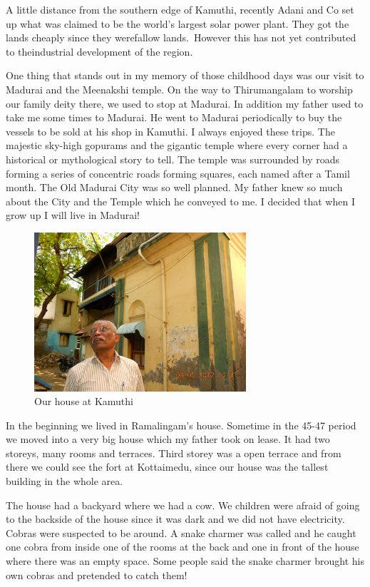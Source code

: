 A little distance from the southern edge of Kamuthi, recently Adani and 
Co set up what was claimed to be the world's largest solar power plant. 
They got the lands cheaply since they were\break fallow lands.\ However this 
has not yet contributed to the\break industrial development of the region.

One thing that stands out in my memory of those childhood days was our 
visit to Madurai and the Meenakshi temple. On the way to Thirumangalam 
to worship our family deity there, we used to stop at Madurai. In 
addition my father used to take me some times to Madurai. He went to 
Madurai periodically to buy the vessels to be sold at his shop in 
Kamuthi. I always enjoyed these trips. The majestic sky-high gopurams 
and the gigantic temple where every corner had a historical or 
mythological story to tell. The temple was surrounded by roads forming a 
series of concentric roads forming squares, each named after a Tamil 
month. The Old Madurai City was so well planned. My father knew so much 
about the City and the Temple which he conveyed to me. I decided that 
when I grow up I will live in Madurai!
\smallskip

\begin{figure}[h]
\centering
\includegraphics[width=0.7\textwidth]{images/new-images/02-Rajaji-home.jpg}
\caption{Our house at Kamuthi}
\end{figure}

In the beginning we lived in Ramalingam's house. Sometime in the 45-47 
period we moved into a very big house which my father took on lease. It 
had two storeys, many rooms and terraces. Third storey was a open 
terrace and from there we could see the fort at Kottaimedu, since our 
house was the tallest building in the whole area.

The house had a backyard where we had a cow. We children were afraid of 
going to the backside of the house since it was dark and we did not have 
electricity. Cobras were suspected to be around. A snake charmer was 
called and he caught one cobra from inside one of the rooms at the back 
and one in front of the house where there was an empty space. Some 
people said the snake charmer brought his own cobras and pretended to 
catch them!

